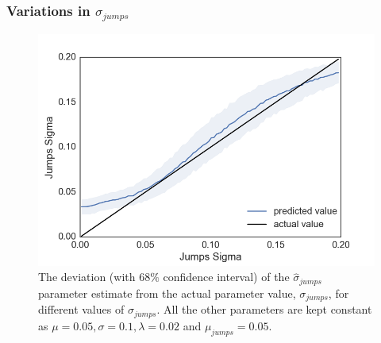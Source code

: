 \documentclass[11pt,oneside,openany,a4paper,english, report, goldenblock
]{usthesis}
\begin{document}
\subsubsection{Variations in $\sigma_{jumps}$}

\begin{figure}[h]
\centering
	\includegraphics[width=0.7\linewidth]{Images/Output-Sensitivity-Results/ConvolutionalNN-MultipleOutput-ELU/Varying-Jumps_sigma/Jumps_Sigma}
	\caption{The deviation (with $68\%$ confidence interval) of the $\hat{\sigma}_{jumps}$ parameter estimate from the actual parameter value, $\sigma_{jumps}$, for different values of $\sigma_{jumps}$. All the other parameters are kept constant as $\mu = 0.05, \sigma = 0.1, \lambda = 0.02$ and $\mu_{jumps} = 0.05$.}
	\label{fig:sensitivity_test:multiple_output:varying_jumps_sigma:jumps_sigma}
	\end{figure}
\end{document}
